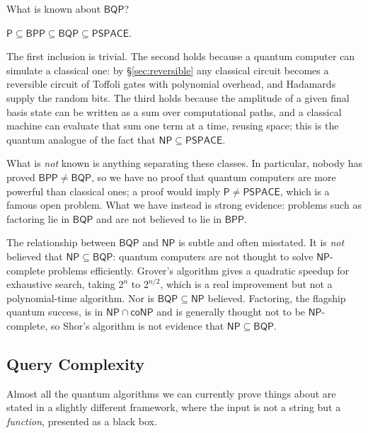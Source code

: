 \documentclass[a4paper]{scrartcl}
\newcommand{\class}[1]{\mathsf{#1}}
\begin{document}
What is known about $\class{BQP}$?

\begin{proposition}
	$\class{P}\subseteq\class{BPP}\subseteq\class{BQP}\subseteq\class{PSPACE}$.
\end{proposition}

The first inclusion is trivial. The second holds because a quantum computer can simulate a classical one: by \S\ref{sec:reversible} any classical circuit becomes a reversible circuit of Toffoli gates with polynomial overhead, and Hadamards supply the random bits. The third holds because the amplitude of a given final basis state can be written as a sum over computational paths, and a classical machine can evaluate that sum one term at a time, reusing space; this is the quantum analogue of the fact that $\class{NP}\subseteq\class{PSPACE}$.

What is \emph{not} known is anything separating these classes. In particular, nobody has proved $\class{BPP}\neq\class{BQP}$, so we have no proof that quantum computers are more powerful than classical ones; a proof would imply $\class{P}\neq\class{PSPACE}$, which is a famous open problem. What we have instead is strong evidence: problems such as factoring lie in $\class{BQP}$ and are not believed to lie in $\class{BPP}$.

\begin{remark}
	The relationship between $\class{BQP}$ and $\class{NP}$ is subtle and often misstated. It is \emph{not} believed that $\class{NP}\subseteq\class{BQP}$: quantum computers are not thought to solve $\class{NP}$-complete problems efficiently. Grover's algorithm gives a quadratic speedup for exhaustive search, taking $2^n$ to $2^{n/2}$, which is a real improvement but not a polynomial-time algorithm. Nor is $\class{BQP}\subseteq\class{NP}$ believed. Factoring, the flagship quantum success, is in $\class{NP}\cap\mathsf{co}\class{NP}$ and is generally thought not to be $\class{NP}$-complete, so Shor's algorithm is not evidence that $\class{NP}\subseteq\class{BQP}$.
\end{remark}

\subsection{Query Complexity}

Almost all the quantum algorithms we can currently prove things about are stated in a slightly different framework, where the input is not a string but a \emph{function}, presented as a black box.
\end{document}
